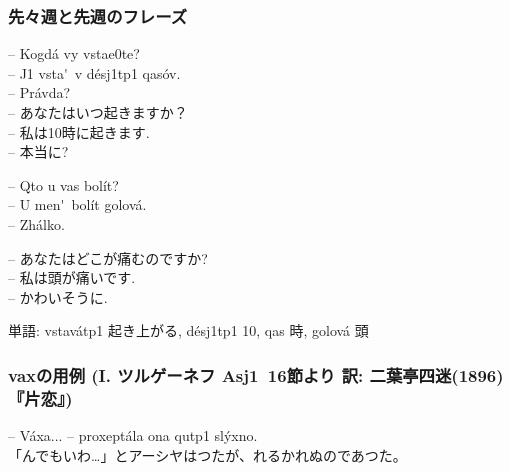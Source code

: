 \documentclass[11pt]{jsarticle}
\begin{document}
\subsubsection*{先々週と先週のフレーズ}
\begin{multicolpar}{2}
\--- Kogd\'a vy vsta{e0}te?\\
\--- {J1} vsta\'\cyryu\ v d\'es{j1}t{p1} qas\'ov.\\
\--- Pr\'avda?\\

\noindent
\--- あなたはいつ起きますか？\\
\--- 私は10時に起きます.\\
\--- 本当に?\\
\end{multicolpar}
\begin{multicolpar}{2}
\--- Qto u vas bol\'it?\\
\--- U men\'\cyrya\ bol\'it golov\'a.\\
\--- {Zh}\'alko.

\noindent
\--- あなたはどこが痛むのですか?\\
\--- 私は頭が痛いです.\\
\--- かわいそうに.
\end{multicolpar}
単語: vstav\'at{p1} 起き上がる, d\'es{j1}t{p1} 10, qas 時, golov\'a 頭
\subsubsection*{vaxの用例 (I. ツルゲーネフ \guillemotleft As{j1}\guillemotright\ 16節より 訳: 二葉亭四迷(1896)『片恋』)}
\noindent
\--- V\'axa... \--- proxept\'ala ona qut{p1} sl\'yxno.\\
「んでもいわ…」とアーシヤはつたが、れるかれぬのであつた。
\end{document}
